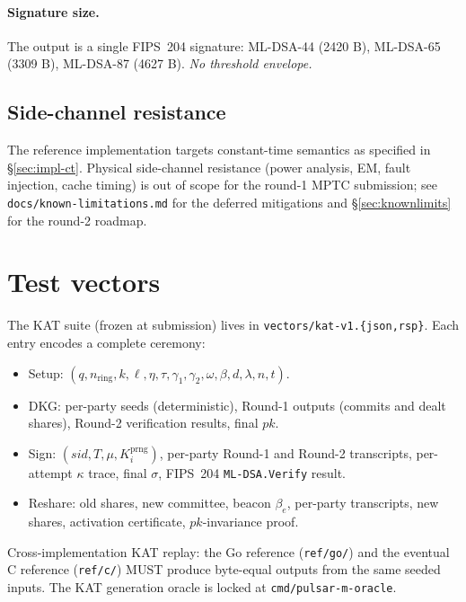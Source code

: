\documentclass[11pt,a4paper]{article}
\theoremstyle{definition}
\theoremstyle{remark}
\begin{document}
\paragraph{Signature size.} The output is a single FIPS~204
signature: ML-DSA-44 (2420 B), ML-DSA-65 (3309 B), ML-DSA-87
(4627 B). \emph{No threshold envelope.}

\subsection{Side-channel resistance}
\label{sec:impl-sidechannel}

The reference implementation targets constant-time semantics as
specified in \S\ref{sec:impl-ct}. Physical side-channel resistance
(power analysis, EM, fault injection, cache timing) is out of scope
for the round-1 MPTC submission; see
\texttt{docs/known-limitations.md} for the deferred mitigations and
\S\ref{sec:knownlimits} for the round-2 roadmap.

\section{Test vectors}
\label{sec:vectors}

The KAT suite (frozen at submission) lives in
\texttt{vectors/kat-v1.\{json,rsp\}}. Each entry encodes a complete
ceremony:

\begin{itemize}[leftmargin=*, itemsep=0pt]
\item Setup: $(q, n_{\mathrm{ring}}, k, \ell, \eta, \tau, \gamma_1, \gamma_2, \omega, \beta, d, \lambda, n, t)$.
\item DKG: per-party seeds (deterministic), Round-1 outputs (commits and dealt shares), Round-2 verification results, final $\mathit{pk}$.
\item Sign: $(\mathit{sid}, T, \mu, K_i^{\mathrm{prng}})$, per-party Round-1 and Round-2 transcripts, per-attempt $\kappa$ trace, final $\sigma$, FIPS~204 \texttt{ML-DSA.Verify} result.
\item Reshare: old shares, new committee, beacon $\beta_e$, per-party transcripts, new shares, activation certificate, $\mathit{pk}$-invariance proof.
\end{itemize}

Cross-implementation KAT replay: the Go reference (\texttt{ref/go/})
and the eventual C reference (\texttt{ref/c/}) MUST produce
byte-equal outputs from the same seeded inputs. The KAT generation
oracle is locked at \texttt{cmd/pulsar-m-oracle}.
\end{document}
